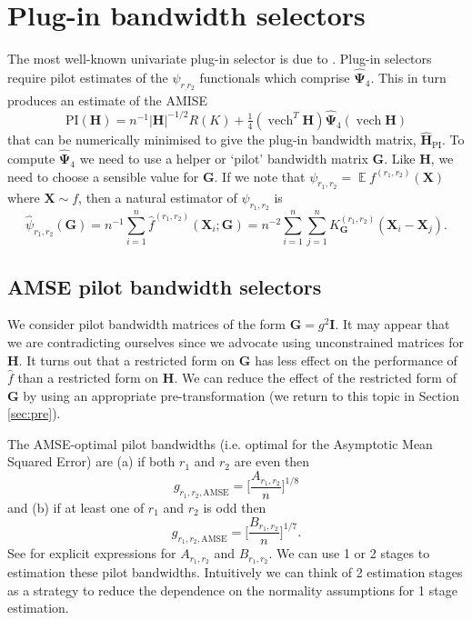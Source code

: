 \documentclass[a4paper,11pt]{article}
\renewcommand{\vec}[1]{\boldsymbol{#1}}
\newcommand{\mat}[1]{\mathbf{#1}}
\newcommand{\gmat}[1]{\boldsymbol{#1}}
\def\HH{\mat{H}}
\def\G{\mat{G}}
\def\AMSE{\mathrm{AMSE}}
\def\PI{\mathrm{PI}}
\def\vecX{\vec{X}}
\DeclareMathOperator{\E}{\boldsymbol{\mathbb{E}}}
\DeclareMathOperator{\VECH}{vech}
\begin{document}
\section{Plug-in bandwidth selectors}
\label{sec:plugin}

The most well-known univariate plug-in selector is due to
\citet*{sheather91}.
Plug-in selectors require pilot estimates of the
$\psi_{r_, r_2}$ functionals which comprise 
$\hat{\gmat{\Psi}}_4$. This in turn produces an estimate of the AMISE
\begin{equation}
\PI (\HH) = n^{-1} |\HH| ^{-1/2}
R(K) + \tfrac{1}{4}  (\VECH^T \HH) \hat{\gmat{\Psi}}_4(\VECH \HH)
\label{eq:api}
\end{equation}
that can be numerically minimised to give the plug-in bandwidth matrix, 
$\hat{\HH}_\PI$.  
To compute $\hat{\gmat{\Psi}}_4$ we need to use a helper or `pilot' bandwidth
matrix $\G$. Like $\HH$, we need to choose a sensible value for $\G$.  
If we note that 
$\psi_{r_1, r_2}= \E f^{(r_1, r_2)}(\vec{X})$ where $\vecX \sim f$,
then a natural estimator of $\psi_{r_1, r_2}$ is
\begin{equation}
\hat{\psi}_{r_1, r_2} (\G) = n^{-1}
\sum_{i=1}^n \hat{f}^{(r_1, r_2)} (\vec{X}_i; \G) =
n^{-2}\sum_{i=1}^{n}\sum_{j=1}^{n} K^{(r_1, r_2)}_{\G} (\vec{X}_i -
\vec{X}_j).
\label{psir} 
\end{equation}


\subsection{AMSE pilot bandwidth selectors}

We consider pilot bandwidth matrices of the form 
$\G = g^2 \mat{I}$. It may appear that we are contradicting
ourselves since we advocate using unconstrained matrices for $\HH$.
It turns out that a restricted form on $\G$ has less effect on the
performance of $\hat{f}$ than a restricted form on $\HH$. We can 
reduce the effect of the restricted form of $\G$ by using
an appropriate pre-transformation 
(we return to this topic in Section \ref{sec:pre}).

The AMSE-optimal pilot bandwidths (i.e. optimal for the Asymptotic
Mean Squared Error) are 
(a) if both $r_1$ and $r_2$ are even then
\begin{equation}
\label{eq:gamse_even} g_{r_1, r_2, \AMSE} = \bigg[ \frac{A_{r_1, r_2}}{n} 
\bigg]^{1/8}
\end{equation}
and (b) if at least one of $r_1$ and $r_2$ is odd then 
\begin{equation}
\label{eq:gamse_odd} g_{r_1, r_2, \AMSE} = \bigg[ \frac{B_{r_1, r_2}}{n} 
\bigg]^{1/7}.
\end{equation}
See \citet*{wand94} for explicit expressions for $A_{r_1, r_2}$ and
$B_{r_1, r_2}$. 
We can use 1 or 2 stages to estimation these pilot bandwidths. 
Intuitively we can think of 2 estimation stages as a strategy to reduce
the dependence on the normality assumptions for 1 stage estimation. 
\end{document}
